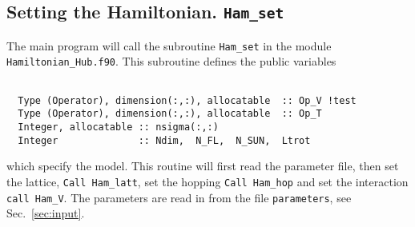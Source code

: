 \subsection{Setting the Hamiltonian.  \texttt{Ham\_set} }
The main program will call the subroutine   \texttt{Ham\_set} in the module \texttt{Hamiltonian\_Hub.f90}.
This  subroutine  defines the  public variables
\begin{lstlisting}

  Type (Operator), dimension(:,:), allocatable  :: Op_V !test
  Type (Operator), dimension(:,:), allocatable  :: Op_T
  Integer, allocatable :: nsigma(:,:)
  Integer              :: Ndim,  N_FL,  N_SUN,  Ltrot

\end{lstlisting}
which specify the model.  This  routine will first  read the parameter file,  then set the lattice, \texttt{Call Ham\_latt},  set the hopping \texttt{Call Ham\_hop}  and set the interaction
\texttt{call Ham\_V}.  
The parameters are read in from the file \texttt{parameters}, see Sec.~\ref{sec:input}.
% 
% 

